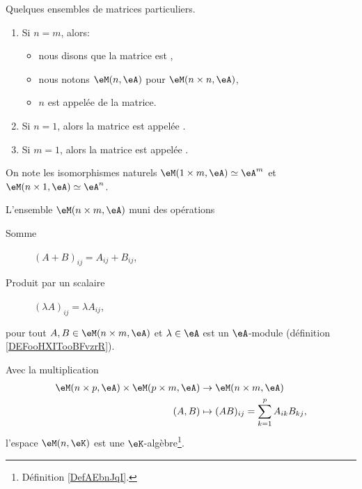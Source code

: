 \begin{definition}
Quelques ensembles de matrices particuliers.
  \begin{enumerate}
  \item Si \( n=m\), alors:
  \begin{itemize}
    \item nous disons que la matrice est ,
    \item nous notons \( \eM(n,\eA)\) pour \( \eM(n\times n,\eA)\),
    \item \( n \) est appelée  de la matrice.
  \end{itemize}
  \item Si \( n = 1 \), alors la matrice est appelée .
    \item Si \( m = 1 \), alors la matrice est appelée .
  \end{enumerate}
\end{definition}

\begin{normaltext}
    On note les isomorphismes naturels \( \eM(1\times m,\eA) \simeq \eA^m\) et \( \eM(n\times 1,\eA) \simeq \eA^n\).
\end{normaltext}

\begin{lemmaDef}        \label{LEMooYWTEooQyLxKv}
    L'ensemble \( \eM(n\times m, \eA)\) muni des opérations
    \begin{description}
        \item[Somme] \( (A+B)_{ij}=A_{ij}+B_{ij}\),
        \item[Produit par un scalaire] \( (\lambda A)_{ij}=\lambda A_{ij}\),
    \end{description}
    pour tout \( A,B\in \eM(n\times m,\eA ) \) et \( \lambda\in \eA \) est un \( \eA\)-module (définition \ref{DEFooHXITooBFvzrR}).
\end{lemmaDef}

\begin{lemmaDef}        \label{LEMooMBZTooKdGvON}
    Avec la multiplication
    \begin{equation}
        \begin{aligned}
             \eM(n\times p,\eA)\times \eM(p\times m,\eA)&\to \eM(n\times m,\eA) \\
             (A,B)&\mapsto (AB)_{ij}=\sum_{k=1}^pA_{ik}B_{kj},
        \end{aligned}
    \end{equation}
    l'espace \( \eM(n,\eK)\) est une \( \eK\)-algèbre\footnote{Définition \ref{DefAEbnJqI}.}.
\end{lemmaDef}

